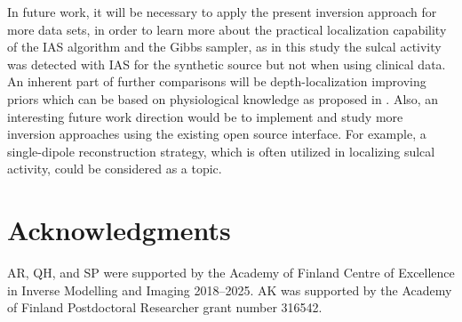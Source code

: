 \documentclass[5p]{elsarticle}
\begin{document}
In future work, it will be necessary to apply the present inversion approach for more data sets, in order to learn more about the practical localization capability of the IAS algorithm and the Gibbs sampler, as in this study the sulcal activity  was detected with IAS for the  synthetic source but not when using clinical data. An inherent part of further comparisons will be depth-localization improving priors which can be based on physiological knowledge as proposed in  \cite{calvetti2015,calvetti2018}.  Also, an interesting future work direction would be to implement and study more inversion approaches using the existing open source interface. For example, a single-dipole reconstruction strategy, which is often utilized in localizing sulcal activity, could be considered as a topic.

\section*{Acknowledgments}

AR, QH, and SP were supported by the Academy of Finland Centre of Excellence in Inverse Modelling and Imaging 2018--2025. AK was supported by the Academy of Finland Postdoctoral Researcher grant number  316542.










\end{document}
